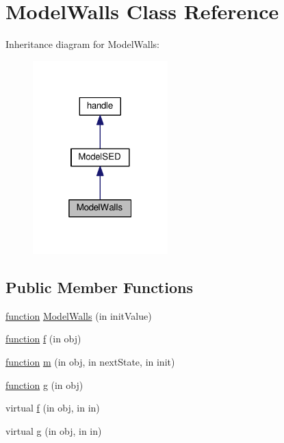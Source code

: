\hypertarget{class_model_walls}{}\section{Model\+Walls Class Reference}
\label{class_model_walls}


Inheritance diagram for Model\+Walls\+:\nopagebreak
\begin{figure}[H]
\begin{center}
\leavevmode
\includegraphics[width=148pt]{class_model_walls__inherit__graph}
\end{center}
\end{figure}
\subsection*{Public Member Functions}
\begin{DoxyCompactItemize}
\item 
\hyperlink{_plan__desuma_functions_8m_ac2ffb26d6f42d3bbcd7847b0873403f4}{function} \hyperlink{class_model_walls_a5aa5cfd2186c06e8ab37ce531b1a9720}{Model\+Walls} (in init\+Value)
\item 
\hyperlink{_plan__desuma_functions_8m_ac2ffb26d6f42d3bbcd7847b0873403f4}{function} \hyperlink{class_model_walls_af07620c51528eb1e504befcf52ca0cee}{f} (in obj)
\item 
\hyperlink{_plan__desuma_functions_8m_ac2ffb26d6f42d3bbcd7847b0873403f4}{function} \hyperlink{class_model_walls_a3140f24c6c4b80037b7d4f521c6ae2d3}{m} (in obj, in next\+State, in init)
\item 
\hyperlink{_plan__desuma_functions_8m_ac2ffb26d6f42d3bbcd7847b0873403f4}{function} \hyperlink{class_model_walls_a07dadfabe92bf9a144b8a862720e7746}{g} (in obj)
\item 
virtual \hyperlink{class_model_s_e_d_ac36f9451c43b120828af4380858f2024}{f} (in obj, in in)
\item 
virtual \hyperlink{class_model_s_e_d_a2d53b5f665cfcf64d482bbfa8a6eb098}{g} (in obj, in in)
\end{DoxyCompactItemize}
